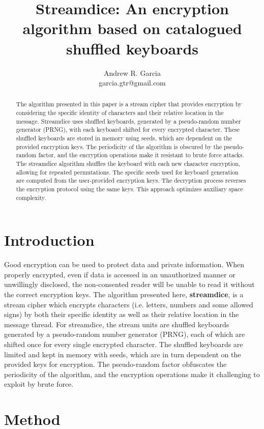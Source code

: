 \documentclass{article}
\title{Streamdice: An encryption algorithm based on catalogued shuffled keyboards}
\author{Andrew R. Garcia\\garcia.gtr@gmail.com}
\date{}
\begin{document}
\maketitle

\begin{abstract}
The algorithm presented in this paper is a stream cipher that provides encryption by considering the specific 
identity of characters and their relative location in the message. Streamdice uses shuffled keyboards,
generated by a pseudo-random number generator (PRNG), with each keyboard shifted for every encrypted character. 
These shuffled keyboards are stored in memory using seeds, which are dependent on the provided encryption keys. 
The periodicity of the algorithm is obscured by the pseudo-random factor, and the encryption operations make it resistant to brute force attacks. 
The streamdice algorithm shuffles the keyboard with each new character encryption, allowing for repeated permutations. 
The specific seeds used for keyboard generation are computed from the user-provided encryption keys. 
The decryption process reverses the encryption protocol using the same keys. This approach optimizes auxiliary space complexity.

\end{abstract}

\section{Introduction}
Good encryption can be used to protect data and private information. 
When properly encrypted, even if data is accessed in an unauthorized manner or unwillingly disclosed, 
the non-consented reader will be unable to read it without the correct encryption keys. The algorithm presented here, \textbf{streamdice}, 
is a stream cipher which encrypts characters (i.e. letters, numbers and some allowed signs) by both their specific identity as well as their 
relative location in the message thread. For streamdice, the stream units are shuffled keyboards generated by a pseudo-random number generator
(PRNG), each of which are shifted once for every single encrypted character. The shuffled keyboards are limited and kept in memory
with seeds, which are in turn dependent on the provided keys for encryption. The pseudo-random factor obfuscates the periodicity 
of the algorithm, and the encryption operations make it challenging to exploit by brute force.

\section{Method}
\end{document}

